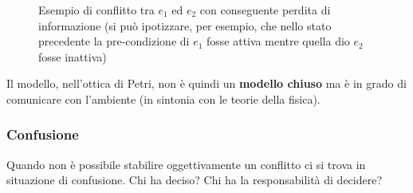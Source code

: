 \begin{definizione}
\begin{figure}[H]
    \caption{Esempio di conflitto tra $e_1$ ed
      $e_2$ con conseguente perdita di informazione (si può ipotizzare, per
      esempio, che nello stato precedente la pre-condizione di $e_1$ fosse attiva
      mentre quella dio $e_2$ fosse inattiva)} 
  \end{figure}
  Il modello, nell'ottica di Petri, non è quindi un \textbf{modello chiuso} ma è
  in grado di comunicare con l'ambiente (in sintonia con le teorie della
  fisica). 
\end{definizione} \vspace{5mm} %
\subsubsection{Confusione}
Quando non è possibile stabilire oggettivamente un conflitto ci si trova in
situazione di confusione. Chi ha deciso? Chi ha la responsabilità di decidere?
